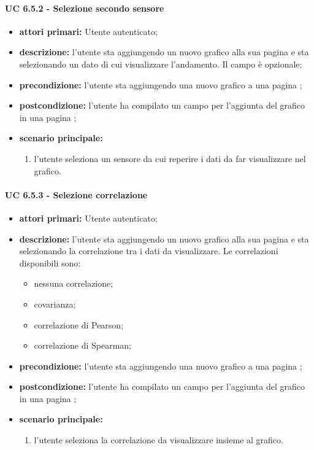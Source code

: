 			\paragraph{UC 6.5.2 - Selezione secondo sensore}
			\begin{itemize}
				\item \textbf{attori primari:} Utente autenticato;
				\item \textbf{descrizione:} l'utente sta aggiungendo un nuovo grafico alla sua pagina  e sta selezionando un dato di cui visualizzare l'andamento. Il campo è opzionale;
				\item \textbf{precondizione:} l'utente sta aggiungendo una nuovo grafico a una pagina ;
				\item \textbf{postcondizione:} l'utente ha compilato un campo per l'aggiunta del grafico in una pagina ;
				\item \textbf{scenario principale:}
				\begin{enumerate}
					\item{l'utente seleziona un sensore da cui reperire i dati da far visualizzare nel grafico.}
				\end{enumerate}	
			\end{itemize}

			\paragraph{UC 6.5.3 - Selezione correlazione}
			\begin{itemize}
				\item \textbf{attori primari:} Utente autenticato;
				\item \textbf{descrizione:} l'utente sta aggiungendo un nuovo grafico alla sua pagina  e sta selezionando la correlazione tra i dati da visualizzare. Le correlazioni disponibili sono:
				\begin{itemize}
					\item nessuna correlazione;
					\item covarianza;
					\item correlazione di Pearson;
					\item correlazione di Spearman;
				\end{itemize}
				\item \textbf{precondizione:} l'utente sta aggiungendo una nuovo grafico a una pagina ;
				\item \textbf{postcondizione:} l'utente ha compilato un campo per l'aggiunta del grafico in una pagina ;
				\item \textbf{scenario principale:}
				\begin{enumerate}
					\item{l'utente seleziona la correlazione da visualizzare insieme al grafico.}
				\end{enumerate}	
			\end{itemize}

